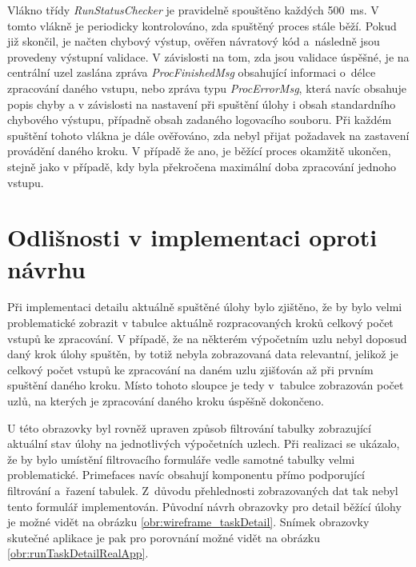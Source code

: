 Vlákno třídy \textit{RunStatusChecker} je pravidelně spouštěno každých 500~ms. V tomto vlákně je periodicky kontrolováno, zda spuštěný proces stále běží. Pokud již skončil, je načten chybový výstup, ověřen návratový kód a~následně jsou provedeny výstupní validace. V závislosti na tom, zda jsou validace úspěšné, je na centrální uzel zaslána zpráva \textit{ProcFinishedMsg} obsahující informaci o~délce zpracování daného vstupu, nebo zpráva typu \textit{ProcErrorMsg}, která navíc obsahuje popis chyby a v závislosti na nastavení při spuštění úlohy i obsah standardního chybového výstupu, případně obsah zadaného logovacího souboru. Při každém spuštění tohoto vlákna je dále ověřováno, zda nebyl přijat požadavek na zastavení provádění daného kroku. V případě že ano, je běžící proces okamžitě ukončen, stejně jako v případě, kdy byla překročena maximální doba zpracování jednoho vstupu.

\section{Odlišnosti v implementaci oproti návrhu}

Při implementaci detailu aktuálně spuštěné úlohy bylo zjištěno, že by bylo velmi problematické zobrazit v tabulce aktuálně rozpracovaných kroků celkový počet vstupů ke zpracování. V případě, že na některém výpočetním uzlu nebyl doposud daný krok úlohy spuštěn, by totiž nebyla zobrazovaná data relevantní, jelikož je celkový počet vstupů ke zpracování na daném uzlu zjišťován až při prvním spuštění daného kroku. Místo tohoto sloupce je tedy v~tabulce zobrazován počet uzlů, na kterých je zpracování daného kroku úspěšně dokončeno.

U této obrazovky byl rovněž upraven způsob filtrování tabulky zobrazující aktuální stav úlohy na jednotlivých výpočetních uzlech. Při realizaci se ukázalo, že by bylo umístění filtrovacího formuláře vedle samotné tabulky velmi problematické. Primefaces navíc obsahují komponentu přímo podporující filtrování a~řazení tabulek. Z~důvodu přehlednosti zobrazovaných dat tak nebyl tento formulář implementován. Původní návrh obrazovky pro detail běžící úlohy je možné vidět na obrázku \ref{obr:wireframe_taskDetail}. Snímek obrazovky skutečné aplikace je pak pro porovnání možné vidět na obrázku \ref{obr:runTaskDetailRealApp}.

